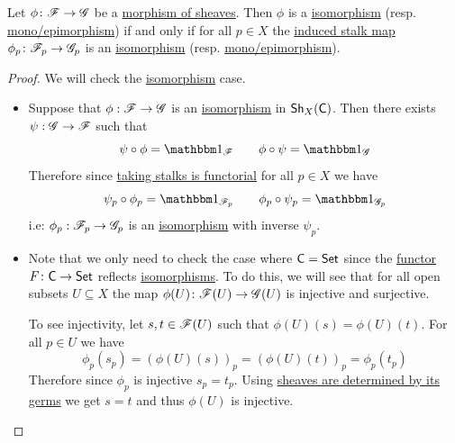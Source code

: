 \documentclass[../../main]{subfiles}
\begin{document}
\begin{proposition}\label{prop:sheaf-isomorphism-determined-at-stalks}
  Let \(\phi\colon \mathscr{F} \to \mathscr{G}\) be a \hyperref[def:sheaf]{morphism of sheaves}.
  Then \(\phi\) is a \hyperref[def:categorical-isomorphism]{isomorphism} (resp. \hyperref[def:mono-epi-morphism]{mono/epimorphism}) if and only if for all \(p \in X\) the \hyperref[def:stalk]{induced stalk map} \(\phi_{p}\colon \mathscr{F}_{p} \to \mathscr{G}_{p}\) is an \hyperref[def:categorical-isomorphism]{isomorphism} (resp. \hyperref[def:mono-epi-morphism]{mono/epimorphism}).
\end{proposition}
\begin{proof}
  We will check the \hyperref[def:categorical-isomorphism]{isomorphism} case.
  \begin{itemize}
    \item[\(\implies\)] Suppose that \(\phi: \mathscr{F} \to \mathscr{G}\) is an \hyperref[def:categorical-isomorphism]{isomorphism} in \(\mathsf{Sh}_{X}(\mathsf{C})\).
          Then there exists \(\psi: \mathscr{G} \to \mathscr{F}\) such that
          \begin{equation*}
            \psi \circ \phi = \id_{\sheaf{F}} \qquad \phi \circ \psi = \id_{\sheaf{G}}
          \end{equation*}
          Therefore since \hyperref[def:stalk]{taking stalks is functorial} for all \(p \in X\) we have
          \begin{equation*}
            \psi_{p} \circ \phi_{p} = \id_{\sheaf{F}_{p}} \qquad \phi_{p} \circ \psi_{p} = \id_{\sheaf{G}_{p}}
          \end{equation*}
          i.e: \(\phi_{p}: \mathscr{F}_{p} \to \mathscr{G}_{p}\) is an \hyperref[def:categorical-isomorphism]{isomorphism} with inverse \(\psi_{p}\).
    \item[\(\impliedby\)] Note that we only need to check the case where \(\mathsf{C} = \mathsf{Set}\) since the \hyperref[def:functor]{functor} \(F\colon \mathsf{C} \to \mathsf{Set}\) reflects \hyperref[def:categorical-isomorphism]{isomorphisms}.
          To do this, we will see that for all open subsets \(U \subseteq X\) the map \(\phi(U)\colon \mathscr{F}(U) \to \mathscr{G}(U)\) is injective and surjective.

          To see injectivity, let \(s, t \in \mathscr{F}(U)\) such that \(\phi(U)(s) = \phi(U)(t)\).
          For all \(p \in U\) we have
          \begin{equation*}
            \phi_{p}(s_{p}) = \left( \phi(U)(s) \right)_{p} = \left( \phi(U)(t) \right)_{p} = \phi_{p}(t_{p})
          \end{equation*}
          Therefore since \(\phi_{p}\) is injective \(s_{p} = t_{p}\).
          Using \hyperref[lemma:sheaf-determined-by-germs]{sheaves are determined by its germs} we get \(s = t\) and thus \(\phi(U)\) is injective.


\end{itemize}
\end{proof}
\end{document}
